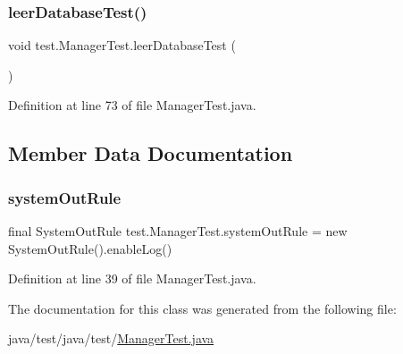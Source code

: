 \subsubsection{\texorpdfstring{leer\+Database\+Test()}{leerDatabaseTest()}}
{\footnotesize\ttfamily void test.\+Manager\+Test.\+leer\+Database\+Test (\begin{DoxyParamCaption}{ }\end{DoxyParamCaption})}



Definition at line 73 of file Manager\+Test.\+java.



\subsection{Member Data Documentation}
\mbox{\label{classtest_1_1_manager_test_a145ff3d1782752daa94a07ab9c2cb312}} 
\subsubsection{\texorpdfstring{system\+Out\+Rule}{systemOutRule}}
{\footnotesize\ttfamily final System\+Out\+Rule test.\+Manager\+Test.\+system\+Out\+Rule = new System\+Out\+Rule().enable\+Log()}



Definition at line 39 of file Manager\+Test.\+java.



The documentation for this class was generated from the following file\+:\begin{DoxyCompactItemize}
\item 
java/test/java/test/\mbox{\hyperlink{_manager_test_8java}{Manager\+Test.\+java}}\end{DoxyCompactItemize}
